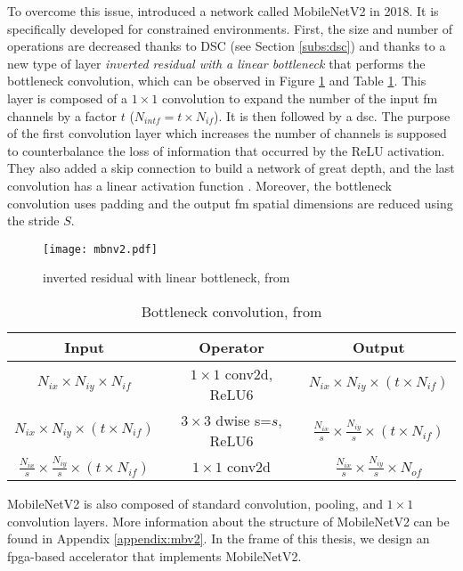 To overcome this issue, \textcite{sandler_mobilenetv2_2018} introduced a network called MobileNetV2 in 2018. It is specifically developed for constrained environments. First, the size and number of operations are decreased thanks to DSC (see Section \ref{subs:dsc}) and thanks to a new type of layer \textit{inverted residual with a linear bottleneck} that performs the bottleneck convolution, which can be observed in Figure \ref{fig:invreslinbot} and Table \ref{tab:invreslinbot}.
This layer is composed of a $1 \times 1$ convolution to expand the number of the input \acrshort{fm} channels by a factor $t$ ($N_{intf} = t \times N_{if}$). It is then followed by a \acrshort{dsc}. The purpose of the first convolution layer which increases the number of channels is supposed to counterbalance the loss of information that occurred by the ReLU activation. They also added a skip connection to build a network of great depth, and the last convolution has a linear activation function \cite{sandler_mobilenetv2_2018}. Moreover, the bottleneck convolution uses padding and the output \acrshort{fm} spatial dimensions are reduced using the stride $S$.

%
\begin{figure}[H]
    \centering
    \texttt{[image: mbnv2.pdf]}
    \caption{inverted residual with linear bottleneck, from \cite{sandler_mobilenetv2_2018}}
    \label{fig:invreslinbot}
\end{figure}

\begin{table}
    \center
    \begin{tabular}{c|c|c}
        Input & Operator & Output \\
        \hline \hline
        $N_{ix} \times N_{iy} \times N_{if}$ & $1 \times 1$ conv2d, ReLU6 & $N_{ix} \times N_{iy} \times (t \times N_{if})$ \\
        $N_{ix} \times N_{iy} \times (t \times N_{if})$ & $3 \times3$ dwise s=$s$, ReLU6 & $\frac{N_{ix}}{s} \times \frac{N_{iy}}{s} \times (t \times N_{if})$ \\
        $\frac{N_{ix}}{s} \times \frac{N_{iy}}{s} \times (t \times N_{if})$ & $1 \times 1$ conv2d & $\frac{N_{ix}}{s} \times \frac{N_{iy}}{s} \times N_{of}$ \\
        \hline \hline
    \end{tabular}
    \caption{Bottleneck convolution, from \cite{sandler_mobilenetv2_2018}}
    \label{tab:invreslinbot}
\end{table}

MobileNetV2 is also composed of standard convolution, pooling, and $1 \times 1$ convolution layers. More information about the structure of MobileNetV2 can be found in Appendix \ref{appendix:mbv2}. In the frame of this thesis, we design an \acrshort{fpga}-based accelerator that implements MobileNetV2.
